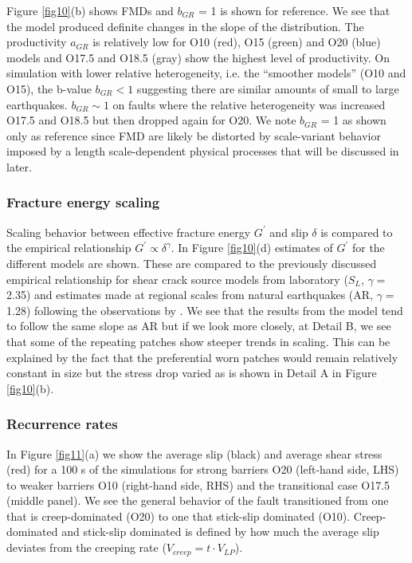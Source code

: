 \documentclass[preprint,1p, 10pt,authoryear]{elsarticle}
\begin{document}
Figure \ref{fig10}(b) shows FMDs and $b_{GR}$ = 1 is shown for reference. We see that the model produced definite changes in the slope of the distribution.  The productivity $a_{GR}$  is relatively low for O10 (red), O15 (green) and O20 (blue) models and O17.5 and O18.5 (gray) show the highest level of productivity. On simulation with lower relative heterogeneity, i.e. the ``smoother models'' (O10 and O15), the b-value $b_{GR} < 1$ suggesting there are similar amounts of small to large earthquakes.  $b_{GR} \sim 1$ on faults where the relative heterogeneity was increased O17.5 and O18.5 but then dropped again for O20. We note $b_{GR}$ = 1 as shown only as reference since FMD are likely be distorted by scale-variant behavior imposed by a length scale-dependent physical processes that will be discussed in later.

\subsubsection{Fracture energy scaling}
\label{FracEnergy}
Scaling behavior between effective fracture energy $G^{'}$ and slip $\delta$  is compared to the  empirical relationship $G^{'} \propto \delta^{\gamma}$. In Figure \ref{fig10}(d) estimates of $G^{'}$ for the different models are shown. These are compared to the previously discussed empirical relationship for shear crack source models from laboratory ($S_{L}$, $\gamma = $2.35) \citep{Selvadurai2019}  and estimates made at regional scales from natural earthquakes (AR, $\gamma = $1.28) following the observations by \citet{Abercrombie2005}.  We see that the results from the model tend to follow the same slope as AR but if we look more closely, at Detail B, we see that some of the repeating patches show steeper trends in scaling. This can be explained by the fact that the preferential worn patches would remain relatively constant in size but the stress drop varied as is shown in Detail A in Figure \ref{fig10}(b).

\subsubsection{Recurrence rates}
\label{Recurrence times}
In Figure \ref{fig11}(a) we show the average slip (black) and average shear stress (red) for a 100 s of the simulations for strong barriers O20 (left-hand side, LHS) to weaker barriers O10 (right-hand side, RHS) and the transitional case O17.5 (middle panel).  We see the general behavior of the fault transitioned from one that is creep-dominated (O20) to one that stick-slip dominated (O10). Creep-dominated and stick-slip dominated is defined by how much the average slip deviates from the creeping rate ($V_{creep} = t\cdot V_{LP}$). 
\end{document}
